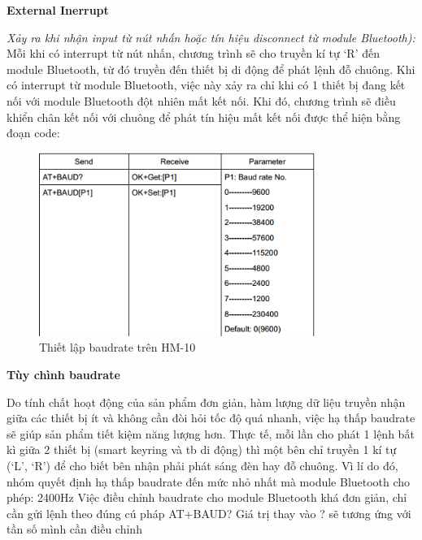 \textbf{External Inerrupt}

\textit{Xảy ra khi nhận input từ nút nhấn hoặc tín hiệu disconnect từ module Bluetooth):}
Mỗi khi có interrupt từ nút nhấn, chương trình sẽ cho truyền kí tự ‘R’ đến module Bluetooth, từ đó truyền đến thiết bị di động để phát lệnh đỗ chuông.
Khi có interrupt từ module Bluetooth, việc này xảy ra chỉ khi có 1 thiết bị đang kết nối với module Bluetooth đột nhiên mất kết nối. Khi đó, chương trình sẽ điều khiển chân kết nối với chuông để phát tín hiệu mất kết nối được thể hiện bằng đoạn code:

	\begin{figure}[H]
		\centering    
		\includegraphics[width=0.8\textwidth]{baud}
		\caption[Thiết lập baudrate trên HM-10]{Thiết lập baudrate trên HM-10}		
		\label{fig: baud}
	\end{figure}

\textbf{Tùy chình baudrate}

Do tính chất hoạt động của sản phẩm đơn giản, hàm lượng dữ liệu truyền nhận giữa các thiết bị ít và không cần đòi hỏi tốc độ quá nhanh, việc hạ thấp baudrate sẽ giúp sản phẩm tiết kiệm năng lượng hơn. Thực tế, mỗi lần cho phát 1 lệnh bất kì giữa 2 thiết bị (smart keyring và tb di động) thì một bên chỉ truyền 1 kí tự (‘L’, ‘R’) để cho biết bên nhận phải phát sáng đèn hay  đỗ chuông. Vì lí do đó, nhóm quyết định hạ thấp baudrate đến mức nhỏ nhất mà module Bluetooth cho phép: 2400Hz
Việc điều chỉnh baudrate cho module Bluetooth khá đơn giản, chỉ cần gửi lệnh theo đúng cú pháp AT+BAUD?
Giá trị thay vào ? sẽ tương ứng với tần số mình cần điều chỉnh

